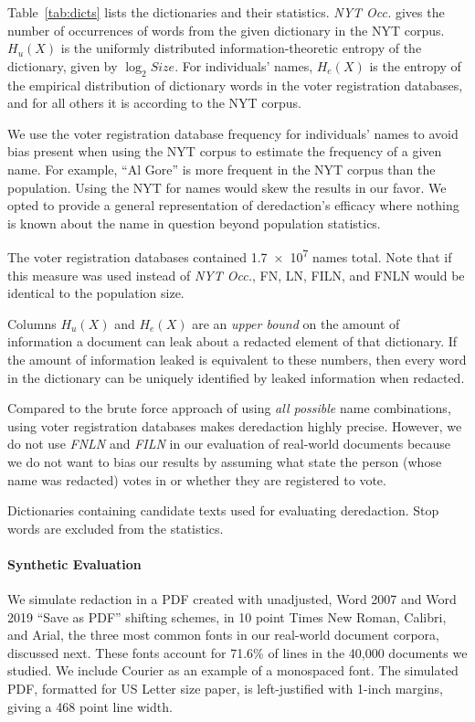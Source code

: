 Table~\ref{tab:dicts} lists the dictionaries and their statistics.
\emph{NYT Occ.} gives the number of occurrences of words from the given dictionary in the NYT corpus.
$H_u(X)$ is the uniformly distributed information-theoretic entropy of the dictionary, given by $\log_2 \mathit{Size}$.
For individuals' names, $H_e(X)$ is the entropy of the empirical distribution of dictionary words in the voter registration databases, and for all others it is according to the NYT corpus.

We use the voter registration database frequency for individuals' names to avoid bias present when using the NYT corpus to estimate the frequency of a given name.
For example, ``Al Gore'' is more frequent in the NYT corpus than the population.
Using the NYT for names would skew the results in our favor.
We opted to provide a general representation of deredaction's efficacy where nothing is known about the name in question beyond population statistics.

The voter registration databases contained \num{1.7e7} names total.
Note that if this measure was used instead of \emph{NYT Occ.}, FN, LN, FILN, and FNLN would be identical to the population size.

Columns $H_u(X)$ and $H_e(X)$ are an \emph{upper bound} on the amount of information a document can leak about a redacted element of that dictionary.
If the amount of information leaked is equivalent to these numbers, then every word in the dictionary can be uniquely identified by leaked information when redacted.

Compared to the brute force approach of using \emph{all possible} name combinations, using voter registration databases makes deredaction highly precise.
However, we do not use \emph{FNLN} and \emph{FILN} in our evaluation of real-world documents because we do not want to bias our results by assuming what state the person (whose name was redacted) votes in or whether they are registered to vote.

\begin{table}
\centering
\caption{
    Dictionaries containing candidate texts used for evaluating deredaction. 
    Stop words are excluded from the statistics.
}\label{tab:dicts}
\small
\end{table}

\paragraph{Synthetic Evaluation}
We simulate redaction in a PDF created with unadjusted, Word 2007 and Word 2019 ``Save as PDF'' shifting schemes, in 10 point Times New Roman, Calibri, and Arial, the three most common fonts in our real-world document corpora, discussed next.
These fonts account for 71.6\% of lines in the 40,000 documents we studied.
We include Courier as an example of a monospaced font.
The simulated PDF, formatted for US Letter size paper, is left-justified with 1-inch margins, giving a 468 point line width.

